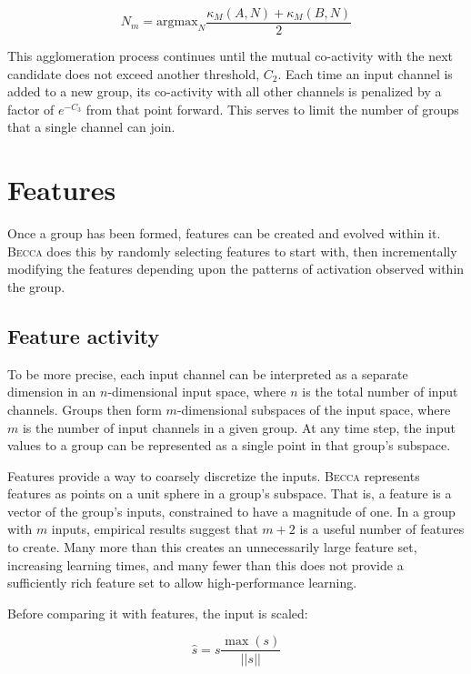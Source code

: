 \begin{equation}
N_m = \mbox{argmax}_{N}  \frac{\kappa_M(A,N) + \kappa_M(B, N)}{ 2}
\end{equation}

This agglomeration process continues until the mutual co-activity with the next candidate does not exceed another threshold, $C_2$.
Each time an input channel is added to a new group, its co-activity with all other channels is penalized by a factor of $e^{-C_3}$ from that point forward. This serves to limit the number of groups that a single channel can join. 

\section{Features}
Once a group has been formed, features can be created and evolved within it. \textsc{Becca} does this by randomly selecting features to start with, then incrementally modifying the features depending upon the patterns of activation observed within the group.

\subsection{Feature activity}

To be more precise, each input channel can be interpreted as a separate dimension in an $n$-dimensional input space, where $n$ is the total number of input channels. Groups then form $m$-dimensional subspaces of the input space, where $m$ is the number of input channels in a given group. At any time step, the input values to a group can be represented as a single point in that group's subspace. 

Features provide a way to coarsely discretize the inputs. \textsc{Becca} represents features as points on a unit sphere in a group's subspace. That is, a feature is a vector of the group's inputs, constrained to have a magnitude of one. In a group with $m$ inputs, empirical results suggest that $m + 2$ is a useful number of features to create. Many more than this creates an unnecessarily large feature set, increasing learning times, and many fewer than this does not provide a sufficiently rich feature set to allow high-performance learning. 

Before comparing it with features, the input is scaled:

\begin{equation}
\hat{s} = s  \frac{\max(s)} {|| s ||}
\end{equation}
 
